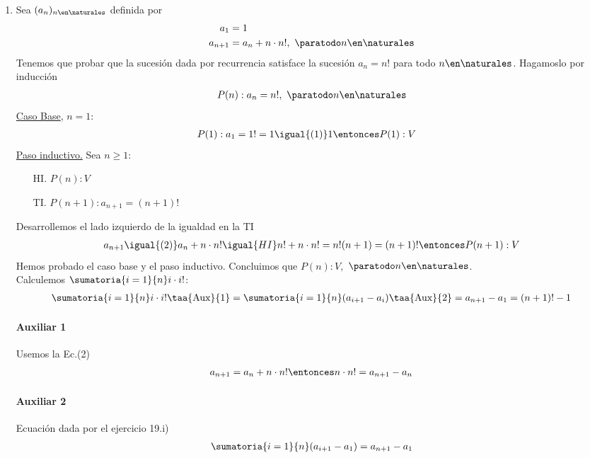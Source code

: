 \begin{enumerate}[label=\roman*)]
    \item Sea $(a_n)_{n \en \naturales }$ definida por
    \setcounter{equation}{0}
    \begin{align}
        a_1 &= 1 \\
        a_{n+1} &= a_n + n \cdot n!,\ \paratodo n \en \naturales 
    \end{align} 
    Tenemos que probar que la sucesión dada por recurrencia satisface la sucesión $a_n = n!$ para todo $n \en 
    \naturales $. 
    Hagamoslo por inducción
    \begin{align*}
        P(n): a_n = n!,\ \paratodo n \en \naturales 
    \end{align*}
    \underline{Caso Base}, $n = 1$:
	    \begin{align*}
		    &P(1): a_1 = 1! = 1 \igual{(1)} 1 \entonces P(1):V
	    \end{align*}
	\underline{Paso inductivo.} Sea $n \geq 1$:
	\begin{enumerate}
        \item[HI.] $P(n): V$
        \item[TI.] $P(n+1): a_{n+1} = (n+1)!$
    \end{enumerate}
 	Desarrollemos el lado izquierdo de la igualdad en la TI
    \begin{align*}
  	    a_{n+1} \igual{(2)} a_n + n \cdot n! \igual{HI} n! + n \cdot n! = n!(n + 1) = (n+1)! 
        \entonces P(n+1):V
    \end{align*}
    Hemos probado el caso base y el paso inductivo. Concluimos que $P(n):V,$ $\paratodo n \en \naturales $.\\

    Calculemos $\displaystyle \sumatoria{i=1}{n} i \cdot i! $:
    \begin{align*}
            \sumatoria{i=1}{n}  i \cdot i! \taa{\text{Aux}}{1}= \sumatoria{i=1}{n}  (a_{i+1} - a_i) \taa{\text{Aux}}{2}=
        a_{n+1} - a_1 = (n+1)! - 1
    \end{align*}

    \paragraph{Auxiliar 1}{
        Usemos la Ec.(2)
        \begin{align*}
            a_{n+1} = a_n + n \cdot n! \entonces n \cdot n! = a_{n+1} - a_n
        \end{align*}
    }
    \paragraph{Auxiliar 2}{
        Ecuación dada por el ejercicio 19.i)
        \begin{align*}
            \sumatoria{i=1}{n} (a_{i+1} - a_1) = a_{n+1} - a_1
        \end{align*}
    }


\end{enumerate}
